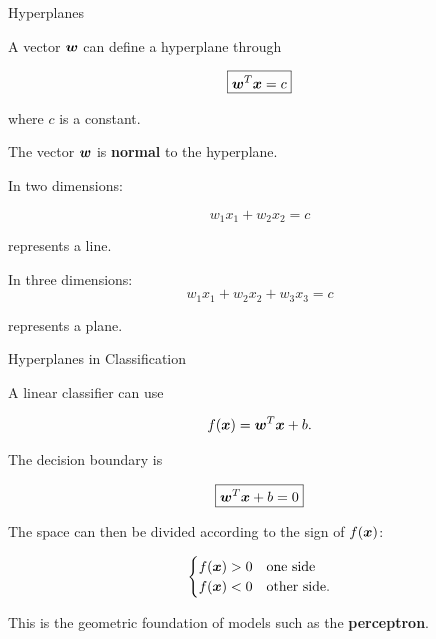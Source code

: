 \begin{frame}{Hyperplanes}

A vector $\bm{w}$ can define a hyperplane through

\[
\boxed{
\bm{w}^{T}\bm{x}=c
}
\]

where $c$ is a constant.

\vspace{0.2cm}

The vector $\bm{w}$ is \textbf{normal} to the hyperplane.

\vspace{0.2cm}

In two dimensions:

\[
w_1x_1+w_2x_2=c
\]

represents a line.

In three dimensions:
\[
w_1x_1+w_2x_2+w_3x_3=c
\]

represents a plane.

\end{frame}



\begin{frame}{Hyperplanes in Classification}

A linear classifier can use

\[
f(\bm{x})
=
\bm{w}^{T}\bm{x}+b.
\]

The decision boundary is

\[
\boxed{
\bm{w}^{T}\bm{x}+b=0
}
\]

\vspace{0.4cm}

The space can then be divided according to the sign of $f(\bm{x})$:

\[
\begin{cases}
f(\bm{x})>0 & \text{one side}\\
f(\bm{x})<0 & \text{other side}.
\end{cases}
\]

\vspace{0.4cm}

This is the geometric foundation of models such as the \textbf{perceptron}.

\end{frame}